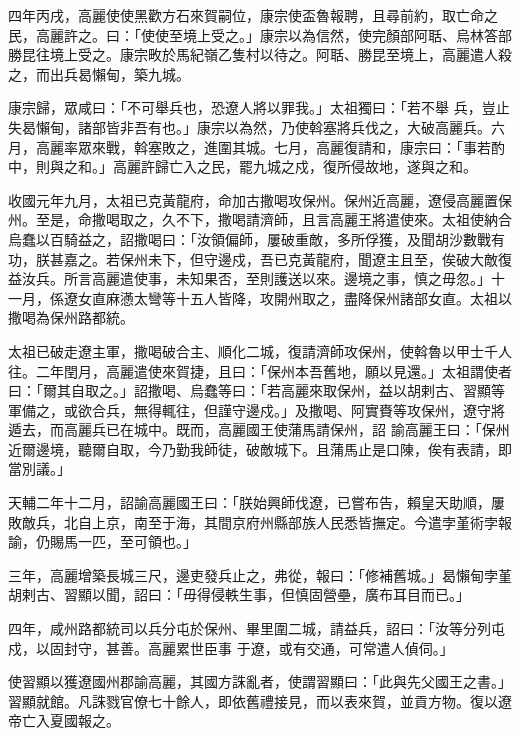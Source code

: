 \begin{pinyinscope}
 四年丙戌，高麗使使黑歡方石來賀嗣位，康宗使盃魯報聘，且尋前約，取亡命之民，高麗許之。曰：「使使至境上受之。」康宗以為信然，使完顏部阿聒、烏林答部勝昆往境上受之。康宗畋於馬紀嶺乙隻村以待之。阿聒、勝昆至境上，高麗遣人殺之，而出兵曷懶甸，築九城。



 康宗歸，眾咸曰：「不可舉兵也，恐遼人將以罪我。」太祖獨曰：「若不舉
 兵，豈止失曷懶甸，諸部皆非吾有也。」康宗以為然，乃使斡塞將兵伐之，大破高麗兵。六月，高麗率眾來戰，斡塞敗之，進圍其城。七月，高麗復請和，康宗曰：「事若酌中，則與之和。」高麗許歸亡入之民，罷九城之戍，復所侵故地，遂與之和。



 收國元年九月，太祖已克黃龍府，命加古撒喝攻保州。保州近高麗，遼侵高麗置保州。至是，命撒喝取之，久不下，撒喝請濟師，且言高麗王將遣使來。太祖使納合烏蠢以百騎益之，詔撒喝曰：「汝領偏師，屢破重敵，多所俘獲，及聞胡沙數戰有功，朕甚嘉之。若保州未下，但守邊戍，吾已克黃龍府，聞遼主且至，俟破大敵復
 益汝兵。所言高麗遣使事，未知果否，至則護送以來。邊境之事，慎之毋忽。」十一月，係遼女直麻懣太彎等十五人皆降，攻開州取之，盡降保州諸部女直。太祖以撒喝為保州路都統。



 太祖已破走遼主軍，撒喝破合主、順化二城，復請濟師攻保州，使斡魯以甲士千人往。二年閏月，高麗遣使來賀捷，且曰：「保州本吾舊地，願以見還。」太祖謂使者曰：「爾其自取之。」詔撒喝、烏蠢等曰：「若高麗來取保州，益以胡剌古、習顯等軍備之，或欲合兵，無得輒往，但謹守邊戍。」及撒喝、阿實賚等攻保州，遼守將遁去，而高麗兵已在城中。既而，高麗國王使蒲馬請保州，詔
 諭高麗王曰：「保州近爾邊境，聽爾自取，今乃勤我師徒，破敵城下。且蒲馬止是口陳，俟有表請，即當別議。」



 天輔二年十二月，詔諭高麗國王曰：「朕始興師伐遼，已嘗布告，賴皇天助順，屢敗敵兵，北自上京，南至于海，其間京府州縣部族人民悉皆撫定。今遣孛堇術孛報諭，仍賜馬一匹，至可領也。」



 三年，高麗增築長城三尺，邊吏發兵止之，弗從，報曰：「修補舊城。」曷懶甸孛堇胡剌古、習顯以聞，詔曰：「毋得侵軼生事，但慎固營壘，廣布耳目而已。」



 四年，咸州路都統司以兵分屯於保州、畢里圍二城，請益兵，詔曰：「汝等分列屯戍，以固封守，甚善。高麗累世臣事
 于遼，或有交通，可常遣人偵伺。」



 使習顯以獲遼國州郡諭高麗，其國方誅亂者，使謂習顯曰：「此與先父國王之書。」習顯就館。凡誅戮官僚七十餘人，即依舊禮接見，而以表來賀，並貢方物。復以遼帝亡入夏國報之。




\end{pinyinscope}
